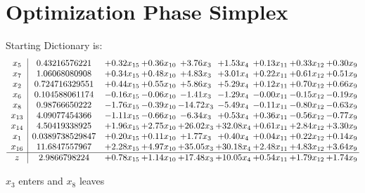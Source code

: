 \documentclass[9pt]{article}
\begin{document}
\section{Optimization Phase Simplex}
Starting Dictionary is:
\[\begin{array}{c| c c@{\hskip 2pt} c@{\hskip 2pt} c@{\hskip 2pt} c@{\hskip 2pt} c@{\hskip 2pt} c@{\hskip 2pt} c@{\hskip 2pt} }
 x_{5}   &  0.43216576221 & +  0.32 x_{15} & +  0.36 x_{10} & +  3.76 x_{3} & +  1.53 x_{4} & +  0.13 x_{11} & +  0.33 x_{12} & +  0.30 x_{9}\\
 x_{7}   &  1.06068080908 & +  0.34 x_{15} & +  0.48 x_{10} & +  4.83 x_{3} & +  3.01 x_{4} & +  0.22 x_{11} & +  0.61 x_{12} & +  0.51 x_{9}\\
 x_{2}   &  0.724716329551 & +  0.44 x_{15} & +  0.55 x_{10} & +  5.86 x_{3} & +  5.29 x_{4} & +  0.12 x_{11} & +  0.70 x_{12} & +  0.66 x_{9}\\
 x_{6}   &  0.104588061174 & -0.16 x_{15} & -0.06 x_{10} & -1.41 x_{3} & -1.29 x_{4} & -0.00 x_{11} & -0.15 x_{12} & -0.19 x_{9}\\
 x_{8}   &  0.98766650222 & -1.76 x_{15} & -0.39 x_{10} & -14.72 x_{3} & -5.49 x_{4} & -0.11 x_{11} & -0.80 x_{12} & -0.63 x_{9}\\
 x_{13}   &  4.09077454366 & -1.11 x_{15} & -0.66 x_{10} & -6.34 x_{3} & +  0.53 x_{4} & +  0.36 x_{11} & -0.56 x_{12} & -0.77 x_{9}\\
 x_{14}   &  4.50419338925 & +  1.96 x_{15} & +  2.75 x_{10} & + 26.02 x_{3} & + 32.08 x_{4} & +  0.61 x_{11} & +  2.84 x_{12} & +  3.30 x_{9}\\
 x_{1}   &  0.0389738529847 & +  0.20 x_{15} & +  0.11 x_{10} & +  1.77 x_{3} & +  0.40 x_{4} & +  0.04 x_{11} & +  0.22 x_{12} & +  0.14 x_{9}\\
 x_{16}   &  11.6847557967 & +  2.28 x_{15} & +  4.97 x_{10} & + 35.05 x_{3} & + 30.18 x_{4} & +  2.48 x_{11} & +  4.83 x_{12} & +  3.64 x_{9}\\
\hline
z    &  2.9866798224 & +  0.78 x_{15} & +  1.14 x_{10} & + 17.48 x_{3} & + 10.05 x_{4} & +  0.54 x_{11} & +  1.79 x_{12} & +  1.74 x_{9}\\
\end{array}\]


 $ x_{3} $ enters and $ x_{8} $ leaves 
\end{document}
